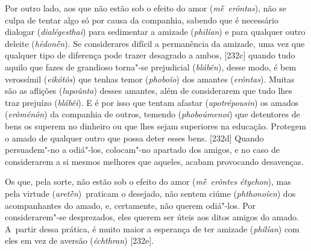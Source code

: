 Por outro lado, aos que não estão sob o efeito do amor
(\emph{mḕ~erôntas}), não se culpa de tentar algo só por causa da
companhia, sabendo que é necessário dialogar (\emph{dialégesthai}) para
sedimentar a amizade (\emph{philían}) e para qualquer outro deleite
(\emph{hēdonḗn}). Se considerares difícil a permanência da amizade, uma
vez que qualquer tipo de diferença pode trazer desagrado a ambos,
[232c] quando tudo aquilo que fazes de grandioso torna"-se
prejudicial (\emph{blábên}), desse modo, é bem verossímil
(\emph{eikótôs}) que tenhas temor (\emph{phoboîo}) dos amantes
(\emph{erôntas}). Muitas são as aflições (\emph{lupoûnta}) desses
amantes, além de considerarem que tudo lhes traz prejuízo
(\emph{blábêi}). E é por isso que tentam afastar (\emph{apotrépousin})
os amados (\emph{erôménôn}) da companhia de outros, temendo
(\emph{phoboúmenoi}) que detentores de bens os superem no dinheiro ou
que lhes sejam superiores na educação. Protegem o amado de qualquer
outro que possa deter esses bens. [232d] Quando persuadem"-no a
odiá"-los, colocam"-no apartado dos amigos, e no caso de considerarem a si
mesmos melhores que aqueles, acabam provocando desavenças.

Os que, pela sorte, não estão sob o efeito do amor (\emph{mḕ~erôntes
étychon}), mas pela virtude (\emph{aretḕn})~praticam o desejado, não
sentem ciúme (\emph{phthonoîen}) dos acompanhantes do amado, e,
certamente, não querem odiá"-los. Por considerarem"-se desprezados, eles
querem ser úteis aos ditos amigos do amado. A~partir dessa prática, é
muito maior a esperança de ter amizade (\emph{philían}) com eles em vez
de aversão (\emph{échthran}) [232e].

